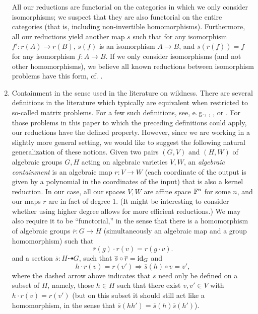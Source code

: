 \documentclass[11pt]{article}
\begin{document}
\begin{enumerate}
All our reductions are functorial on the categories in which we only consider 
isomorphisms; we 
suspect that they are also functorial on the entire categories (that is, including 
non-invertible homomorphisms). Furthermore, all our reductions yield another map 
$\overline{s}$ such that for any isomorphism $f'\colon r(A) \to r(B)$, 
$\overline{s}(f)$ is an isomorphism $A \to B$, and $\overline{s}(\overline{r}(f)) 
= f$ for any isomorphism $f\colon A \to B$. If we only consider isomorphisms (and 
not other homomorphisms), we believe all known reductions between isomorphism 
problems have this form, cf. \cite{BabaiSR}.

\item \label{reduction:algebraic} Containment in the sense used in the literature on wildness. There are several definitions in the literature which typically are equivalent when restricted to so-called matrix problems. For a few such definitions, see, e.\,g., \cite[Def.~1.2]{FGS19}, \cite{Sergeichuk2000}, or \cite[Def.~XIX.1.3]{SimsonSkowronski}. For those problems in this paper to which the preceding definitions could apply, our reductions have the defined property. However, since we are working in a slightly more general setting, we would like to suggest the following natural generalization of these notions. 
Given two pairs $(G,V)$ and $(H,W)$ of algebraic groups $G,H$ acting on algebraic varieties $V,W$, an \emph{algebraic containment} is an algebraic map $r\colon V \to W$ (each coordinate of the output is given by a polynomial in the coordinates of the input) that is also a kernel reduction. In our case, all our spaces $V,W$ are affine space $\mathbb{F}^n$ for some $n$, and our maps $r$ are in fact of degree 1. (It might be interesting to consider whether using higher degree allows for more efficient reductions.) We may also require it to be ``functorial,'' in the sense that there is a homomorphism of algebraic groups $\overline{r}\colon G \to H$ (simultaneously an algebraic map and a group homomorphism) such that
\[
\overline{r}(g) \cdot r(v) = r(g \cdot v).
\]
and a section $\overline{s}\colon H \dashrightarrow G$, such that $\overline{s} \circ \overline{r} = \operatorname{id}_G$ and
\[
h \cdot r(v) = r(v') \Longrightarrow \overline{s}(h) \circ v = v',
\]
where the dashed arrow above indicates that $\overline{s}$ need only be defined on a subset of $H$, namely, those $h \in H$ such that there exist $v,v' \in V$ with $h \cdot r(v) = r(v')$ (but on this subset it should still act like a homomorphism, in the sense that $\overline{s}(h h') = \overline{s}(h) \overline{s}(h')$).

\end{enumerate}
\end{document}
